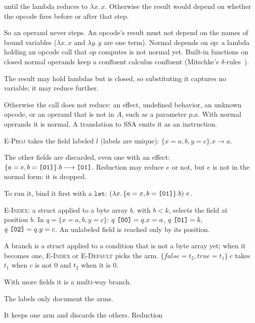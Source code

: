 \documentclass[11pt,letterpaper]{article}
\newcommand{\step}{\mathrel{\longrightarrow}}     %
\newcommand{\lam}[2]{\lambda #1.\,#2}       %
\newcommand{\fn}[1]{\mathit{#1}}                %
\newcommand{\rn}[1]{\textsc{#1}}                %
\newcommand{\kw}[1]{\mathtt{#1}}
\newcommand{\hex}[1]{\text{\ttfamily [#1]}}  %
\newcounter{pt}
\begin{document}
\begin{points}
\begin{subpoints}
    until the lambda reduces to $\lam{x}{x}$. Otherwise the result would depend on whether the opcode fires
    before or after that step.
  \item So an operand never steps. An opcode's result must not depend on the names of bound variables
    ($\lam{x}{x}$ and $\lam{y}{y}$ are one term). Normal depends on $\fn{op}$: a lambda holding an opcode call
    that $\fn{op}$ computes is not normal yet. Built-in functions
    on closed normal operands keep a confluent calculus confluent (Mitschke's $\delta$-rules~\cite{barendregt1984}).
  \item The result may hold lambdas but is closed, so substituting it captures no variable; it may
    reduce further.
  \item Otherwise the call does not reduce: an effect, undefined behavior, an unknown opcode, or an
    operand that is not in $A$, such as a parameter $p.a$. With normal operands it is normal. A translation to SSA emits it as an instruction.
    \end{subpoints}
\item \rn{E-Proj} takes the field labeled $l$ (labels are unique): $\{x = a, b, y = c\}.x \step a$.
  \begin{subpoints}
  \item The other fields are discarded, even one with an effect:
    $\{a = e, b = \hex{01}\}.b \step \hex{01}$. Reduction may
    reduce $e$ or not, but $e$ is not in the normal form: it is dropped.
  \item To run it, bind it first with a $\kw{let}$:
    $(\lam{x}{\{a = x, b = \hex{01}\}.b})\ e$.
    \end{subpoints}
\item \rn{E-Index}: a struct applied to a byte array $b$, with $b < k$, selects the field at position $b$.
  In $q = \{x = a, b, y = c\}$: $q\ \hex{00} = q.x = a$, $q\ \hex{01} = b$,
  $q\ \hex{02} = q.y = c$. An unlabeled field is reached only by its position.
  \begin{subpoints}
    \item\label{p:branch} A branch is a struct applied to a condition that is not a byte array yet; when it
    becomes one, \rn{E-Index} or \rn{E-Default} picks the arm.
    $\{\mathit{false} = t_2, \mathit{true} = t_1\}\ c$ takes $t_1$ when $c$ is
    not $0$ and $t_2$ when it is $0$.
  \item With more fields it is a multi-way branch.
  \item The labels only document the arms.
  \item It keeps one arm and discards the others. Reduction

\end{subpoints}
\end{points}
\end{document}
